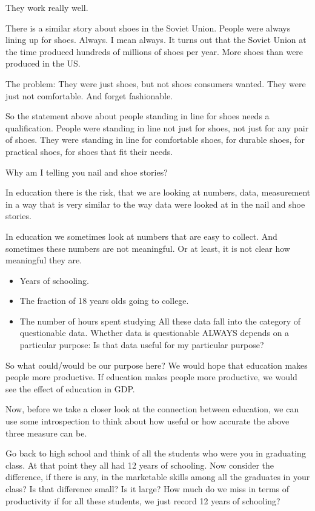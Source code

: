 \documentclass[
]{book}
\providecommand{\tightlist}{%
  \setlength{\itemsep}{0pt}\setlength{\parskip}{0pt}}
\begin{document}
They work really well.

There is a similar story about shoes in the Soviet Union. People were always lining up for shoes. Always. I mean always. It turns out that the Soviet Union at the time produced hundreds of millions of shoes per year. More shoes than were produced in the US.

The problem: They were just shoes, but not shoes consumers wanted. They were just not comfortable. And forget fashionable.

So the statement above about people standing in line for shoes needs a qualification. People were standing in line not just for shoes, not just for any pair of shoes. They were standing in line for comfortable shoes, for durable shoes, for practical shoes, for shoes that fit their needs.

Why am I telling you nail and shoe stories?

In education there is the risk, that we are looking at numbers, data, measurement in a way that is very similar to the way data were looked at in the nail and shoe stories.

In education we sometimes look at numbers that are easy to collect. And sometimes these numbers are not meaningful. Or at least, it is not clear how meaningful they are.

\begin{itemize}
\tightlist
\item
  Years of schooling.
\item
  The fraction of 18 years olds going to college.
\item
  The number of hours spent studying
  All these data fall into the category of questionable data. Whether data is questionable ALWAYS depends on a particular purpose: Is that data useful for my particular purpose?
\end{itemize}

So what could/would be our purpose here? We would hope that education makes people more productive. If education makes people more productive, we would see the effect of education in GDP.

Now, before we take a closer look at the connection between education, we can use some introspection to think about how useful or how accurate the above three measure can be.

Go back to high school and think of all the students who were you in graduating class. At that point they all had 12 years of schooling. Now consider the difference, if there is any, in the marketable skills among all the graduates in your class? Is that difference small? Is it large? How much do we miss in terms of productivity if for all these students, we just record 12 years of schooling?
\end{document}

